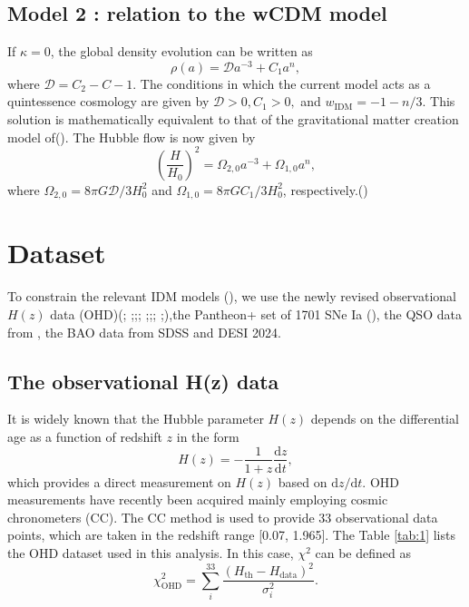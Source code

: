\documentclass[twocolumn]{aastex631}
\begin{document}
\subsection{Model 2 : relation to the wCDM model}

   If $\kappa=0$, the global density evolution can be written as
   \begin{equation}
      \rho(a)=\mathcal{D}a^{-3}+C_1a^{n},
   \end{equation}
   where $\mathcal{D}=C_2-C-1$. The conditions in which the current 
   model acts as a quintessence cosmology are given by $\mathcal{D}>0,
   C_1>0,$ and $w_{\text{IDM}}=-1-n/3$. This solution is mathematically
   equivalent to that of the gravitational matter creation model of().
   The Hubble flow is now given by
   \begin{equation}
      \left(\frac{H}{H_0}\right)^2=\Omega_{2,0}a^{-3}+\Omega_{1,0}a^{n},
   \end{equation}
   where $\Omega_{2,0}=8\pi G\mathcal{D}/3H_0^2$ and 
   $\Omega_{1,0}=8\pi GC_1/3H_0^2$, respectively.(\cite{refId0})
   
\section{Dataset}

   To constrain the relevant IDM models (\cite{refId0}), we use the newly revised
   observational $H(z)$ data (OHD)(\cite{PhysRevD.71.123001};
   \cite{Daniel.Stern_2010};\cite{M.Moresco_2012};\cite{Zhang_2014};
   \cite{Moresco_2016};\cite{10.1093/mnras/stx301};\cite{10.1093/mnrasl/slv037};
   \cite{Borghi_2022};\cite{Jiao_2023}),the Pantheon+ set of 1701 SNe Ia 
   (\cite{Scolnic_2022}), the QSO data from \cite{Lusso_2020}, 
   the BAO data from SDSS and DESI 2024.

\subsection{The observational H(z) data}

   It is widely known that the Hubble parameter $H(z)$ depends on
   the differential age as a function of redshift $z$ in the form
   \begin{equation}
      H(z)=-\frac{1}{1+z}\frac{\mathrm{d}z}{\mathrm{d}t},
   \end{equation}
   which provides a direct measurement on $H(z)$ based on
   $\mathrm{d}z/\mathrm{d}t$.
   OHD measurements have recently been acquired mainly employing
   cosmic chronometers (CC). The CC method is used to provide 33 observational
   data points, which are taken in the redshift range [0.07, 1.965].
   The Table \ref{tab:1} lists the OHD dataset used in this analysis.
   In this case, $\chi^2$ can be defined as
   \begin{equation}
      \chi_{\text{OHD}}^2=\sum_i^{33}\frac{(H_{\text{th}}-H_{\text{data}})^2}{\sigma_i^2}.
   \end{equation}
\end{document}
